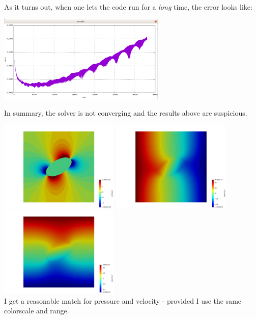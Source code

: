 As it turns out, when one lets the code run for a {\it long} time, 
the error looks like:
\begin{center}
\includegraphics[width=8cm]{python_codes/fieldstone_142/results/case2/error}
\end{center}
In summary, {\color{red} the solver is not converging} and the results above are suspicious.


\begin{center}
\includegraphics[width=5.7cm]{python_codes/fieldstone_142/results/case2/press2}
\includegraphics[width=5.7cm]{python_codes/fieldstone_142/results/case2/u2}
\includegraphics[width=5.7cm]{python_codes/fieldstone_142/results/case2/v2}\\
{\captionfont I get a reasonable match for pressure and velocity - provided I use 
the same colorscale and range.}
\end{center}

